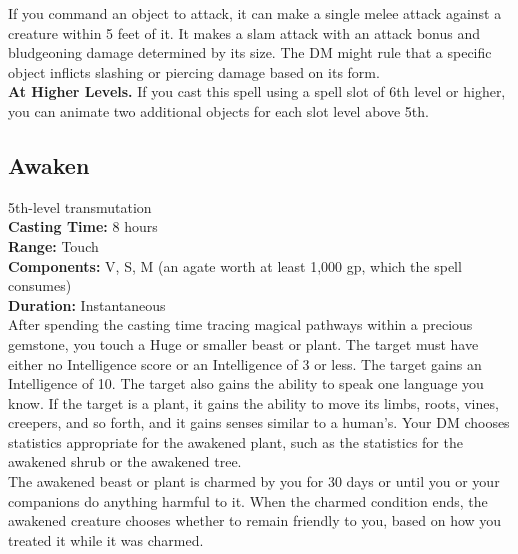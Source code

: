 \documentclass[11pt, A4paper, english]{article}
\begin{document}
If you command an object to attack, it can make a single melee attack against a creature within 5 feet of it. It makes a slam attack with an attack bonus and bludgeoning damage determined by its size. The DM might rule that a specific object inflicts slashing or piercing damage based on its form. \\
\textbf{At Higher Levels.} If you cast this spell using a spell slot of 6th level or higher, you can animate two additional objects for each slot level above 5th.

		\subsection{Awaken}
5th-level transmutation \\
\textbf{Casting Time:} 8 hours \\
\textbf{Range:} Touch \\
\textbf{Components:} V, S, M (an agate worth at least 1,000 gp, which the spell consumes) \\
\textbf{Duration:} Instantaneous \\
After spending the casting time tracing magical pathways within a precious gemstone, you touch a Huge or smaller beast or plant. The target must have either no Intelligence score or an Intelligence of 3 or less. The target gains an Intelligence of 10. The target also gains the ability to speak one language you know. If the target is a plant, it gains the ability to move its limbs, roots, vines, creepers, and so forth, and it gains senses similar to a human’s. Your DM chooses statistics appropriate for the awakened plant, such as the statistics for the awakened shrub or the awakened tree. \\
The awakened beast or plant is charmed by you for 30 days or until you or your companions do anything harmful to it. When the charmed condition ends, the awakened creature chooses whether to remain friendly to you, based on how you treated it while it was charmed.
\end{document}
